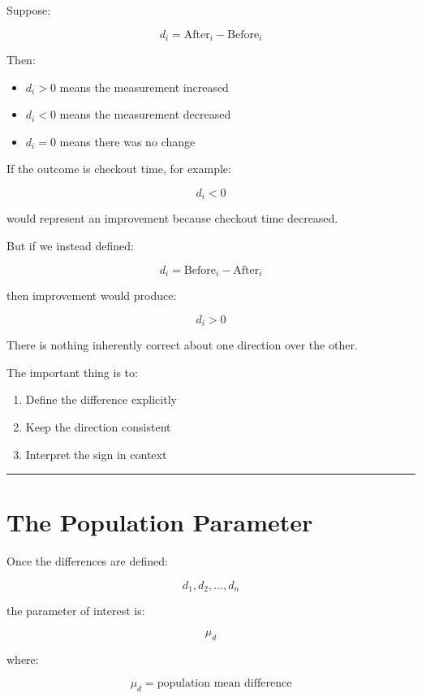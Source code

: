 \documentclass[
  letterpaper,
  DIV=11,
  numbers=noendperiod]{scrreprt}
\providecommand{\tightlist}{%
  \setlength{\itemsep}{0pt}\setlength{\parskip}{0pt}}
\begin{document}
Suppose:

\[
d_i=\text{After}_i-\text{Before}_i
\]

Then:

\begin{itemize}
\tightlist
\item
  \(d_i>0\) means the measurement increased
\item
  \(d_i<0\) means the measurement decreased
\item
  \(d_i=0\) means there was no change
\end{itemize}

If the outcome is checkout time, for example:

\[
d_i<0
\]

would represent an improvement because checkout time decreased.

But if we instead defined:

\[
d_i=\text{Before}_i-\text{After}_i
\]

then improvement would produce:

\[
d_i>0
\]

There is nothing inherently correct about one direction over the other.

The important thing is to:

\begin{enumerate}
\def\labelenumi{\arabic{enumi}.}
\tightlist
\item
  Define the difference explicitly
\item
  Keep the direction consistent
\item
  Interpret the sign in context
\end{enumerate}

\begin{center}\rule{0.5\linewidth}{0.5pt}\end{center}


\chapter{The Population Parameter}\label{the-population-parameter}

Once the differences are defined:

\[
d_1,d_2,\ldots,d_n
\]

the parameter of interest is:

\[
\boxed{\mu_d}
\]

where:

\[
\mu_d
=
\text{population mean difference}
\]
\end{document}
